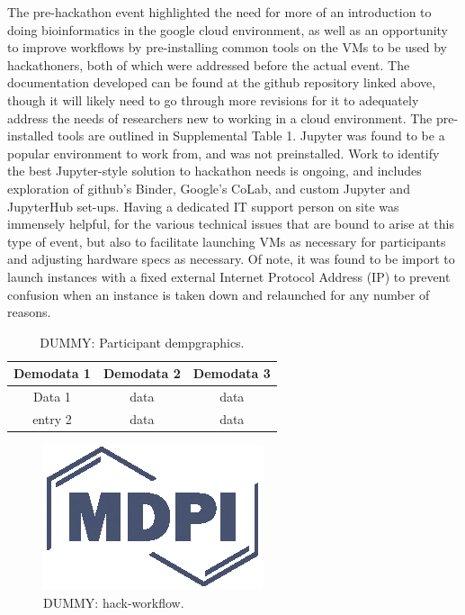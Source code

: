   The pre-hackathon event highlighted the need for more of an introduction to
  doing bioinformatics in the google cloud environment, as well as an
  opportunity to improve workflows by pre-installing common tools on the VMs to
  be used by hackathoners, both of which were addressed before the actual
  event. The documentation developed can be found at the github repository
  linked above, though it will likely need to go through more revisions for it
  to adequately address the needs of researchers new to working in a cloud
  environment. The pre-installed tools are outlined in Supplemental Table 1.
  Jupyter was found to be a popular environment to work from, and was not
  preinstalled. Work to identify the best Jupyter-style solution to hackathon
  needs is ongoing, and includes exploration of github's Binder, Google's
  CoLab, and custom Jupyter and JupyterHub \cite{jupyterNotebook} set-ups.
  Having a dedicated IT support person on site was immensely helpful, for the
  various technical issues that are bound to arise at this type of event, but
  also to facilitate launching VMs as necessary for participants and adjusting
  hardware specs as necessary. Of note, it was found to be import to launch
  instances with a fixed external Internet Protocol Address (IP) to prevent
  confusion when an instance is taken down and relaunched for any number of
  reasons.

  \begin{table}
    \caption{DUMMY: Participant dempgraphics. \label{fig:participants}}
    \centering
    \begin{tabular}{ccc}
    \toprule
    \textbf{Demodata 1}  & \textbf{Demodata 2}  & \textbf{Demodata 3} \\\midrule
                Data 1   & data                 & data                \\
               entry 2   & data                 & data                \\
    \bottomrule
    \end{tabular}
  \end{table}

  \begin{figure}
    \centering
    \includegraphics{Definitions/logo-mdpi}
    \caption{DUMMY: hack-workflow.
            \label{fig:hack-workflow}}
  \end{figure}

